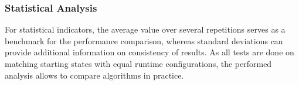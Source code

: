 \subsubsection{Statistical Analysis}

For statistical indicators, the average value over several repetitions serves as a 
benchmark for the performance comparison, whereas standard deviations can provide 
additional information on consistency of results. As all tests are done on matching 
starting states with equal runtime configurations, the performed analysis allows to compare 
algorithms in practice.